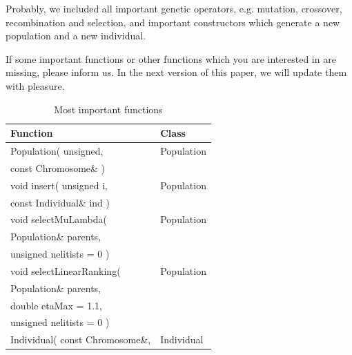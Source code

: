 \documentclass[twocolumn]{article}
\begin{document}
\noindent
Probably, we included all important genetic operators, e.g. mutation,
crossover, recombination and selection, and important constructors
which generate a new population and a new individual.

\noindent
If some important functions or other functions which you are
interested in are missing, please inform us. In the next version of
this paper, we will update them with pleasure.

\begin{table}[h]
\begin{center}
\caption{Most important functions}
\label{MostImportant}
{\scriptsize
\begin{tabular}{|l|l|}\hline
Function                                        & Class                       \\\hline \hline
Population( unsigned,                           & Population                  \\
\hspace*{2mm} const Chromosome\& )              &                             \\\hline
void insert( unsigned i,                        & Population                  \\
\hspace*{2mm} const Individual\& ind )          &                             \\\hline         
void selectMuLambda(                            & Population                  \\
\hspace*{2mm} Population\& parents,             &                             \\
\hspace*{2mm} unsigned nelitists = 0 )          &                             \\\hline
void selectLinearRanking(                       & Population                  \\
\hspace*{2mm} Population\& parents,             &                             \\   
\hspace*{2mm} double etaMax = 1.1,              &                             \\
\hspace*{2mm} unsigned nelitists = 0 )          &                             \\\hline 
Individual( const Chromosome\&,                 & Individual                  \\

\end{tabular}}
\end{center}
\end{table}
\end{document}
